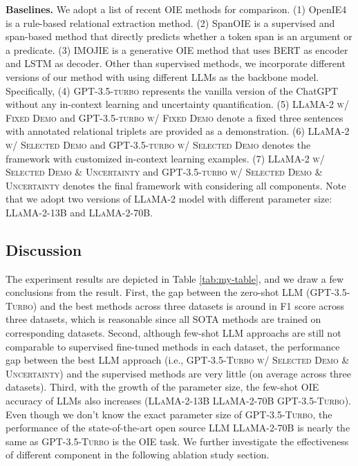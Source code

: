 \documentclass{article}
\begin{document}
\noindent\textbf{Baselines.} We adopt a list of recent OIE methods for comparison. (1) OpenIE4 \cite{mausam2016open} is a rule-based relational extraction method. (2) SpanOIE \cite{zhan2020span} is a supervised and span-based method that directly predicts whether a token span is an argument or a predicate. (3) IMOJIE \cite{kolluru2020imojie} is a generative OIE method that uses BERT as encoder and LSTM as decoder. Other than supervised methods, we incorporate different versions of our method with using different LLMs as the backbone model. Specifically, (4) \textsc{GPT-3.5-turbo} represents the vanilla version of the ChatGPT without any in-context learning and uncertainty quantification. (5) \textsc{LLaMA-2 w/ Fixed Demo} and \textsc{GPT-3.5-turbo w/ Fixed Demo} denote a fixed three sentences with annotated relational triplets are provided as a demonstration. (6) \textsc{LLaMA-2 w/ Selected Demo} and \textsc{GPT-3.5-turbo w/ Selected Demo} denotes the framework with customized in-context learning examples. (7) \textsc{LLaMA-2 w/ Selected Demo \& Uncertainty} and \textsc{GPT-3.5-turbo w/ Selected Demo \& Uncertainty} denotes the final framework with considering all components. Note that we adopt two versions of \textsc{LLaMA-2} model with different parameter size: \textsc{LLaMA-2-13B} and \textsc{LLaMA-2-70B}.

\subsection{Discussion}
The experiment results are depicted in Table \ref{tab:my-table}, and we draw a few conclusions from the result. First, the gap between the zero-shot LLM (\textsc{GPT-3.5-Turbo}) and the best methods across three datasets is around  in F1 score across three datasets, which is reasonable since all SOTA methods are trained on corresponding datasets. Second, although few-shot LLM approachs are still not comparable to supervised fine-tuned methods in each dataset, the performance gap between the best LLM approach (i.e., \textsc{GPT-3.5-Turbo w/ Selected Demo \& Uncertainty}) and the supervised methods are very little (on average  across three datasets). Third, with the growth of the parameter size, the few-shot OIE accuracy of LLMs also increases (\textsc{LLaMA-2-13B} \textsc{LLaMA-2-70B}  \textsc{GPT-3.5-Turbo}). Even though we don't know the exact parameter size of \textsc{GPT-3.5-Turbo}, the performance of the state-of-the-art open source LLM \textsc{LLaMA-2-70B} is nearly the same as \textsc{GPT-3.5-Turbo} is the OIE task. We further investigate the effectiveness of different component in the following ablation study section.
\end{document}
